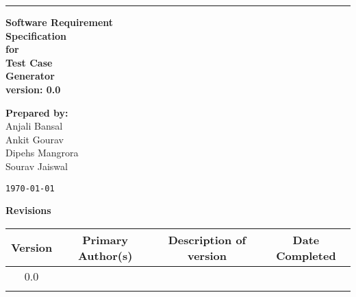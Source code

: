 \documentclass{article}
\begin{document}
\begin{titlepage}
    \hrule height 0.1cm
    \vspace{40pt}
    \begin{flushright}
        \Huge\textbf{Software Requirement\\Specification\\}
        \vspace{30pt}
        \Large\textbf{for\\}
        \vspace{25pt}
        \huge\textbf{Test Case\\Generator\\}
        \vspace{25pt}
        \Large\textbf{version: 0.0}
        \vspace{50pt}

        \vfill
        \begin{Large}
            \textbf{Prepared by:\\}
            Anjali Bansal\\
            Ankit Gourav\\
            Dipehs Mangrora\\
            Sourav Jaiswal\\
        \end{Large}
        \vfill
    \end{flushright}

    \texttt{\today}
\end{titlepage}
\pagebreak

\tableofcontents
\vfill

\begin{table}[H]
    \begin{flushleft}
        \Large\textbf{Revisions}
    \end{flushleft}
    \vspace{10pt}\normalsize
    \def\arraystretch{1.2}
    \centering
    \setlength{\tabcolsep}{25pt}
    \begin{tabular}{|c|c|c|c|}
        \hline
        Version & Primary Author(s) & Description of version & Date Completed\\
        \hline\hline
        0.0 & & & \\
        \hline
        & & & \\
        \hline
    \end{tabular}
\end{table}
\pagebreak
\end{document}
